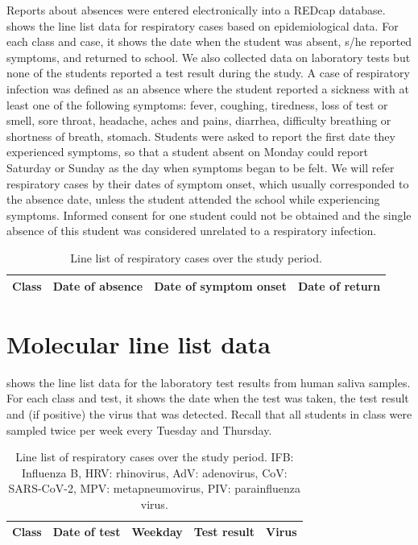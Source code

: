 \documentclass[fleqn,11pt]{wlscirep_supp}
\begin{document}
Reports about absences were entered electronically into a REDcap database\cite{Harris2009,Harris2019}.  shows the line list data for respiratory cases based on epidemiological data. For each class and case, it shows the date when the student was absent, s/he reported symptoms, and returned to school. We also collected data on laboratory tests but none of the students reported a test result during the study. A case of respiratory infection was defined as an absence where the student reported a sickness with at least one of the following symptoms: fever, coughing, tiredness, loss of test or smell, sore throat, headache, aches and pains, diarrhea, difficulty breathing or shortness of breath, stomach. Students were asked to report the first date they experienced symptoms, so that a student absent on Monday could report Saturday or Sunday as the day when symptoms began to be felt. We will refer respiratory cases by their dates of symptom onset, which usually corresponded to the absence date, unless the student attended the school while experiencing symptoms. Informed consent for one student could not be obtained and the single absence of this student was considered unrelated to a respiratory infection. 

{\footnotesize\begin{longtable}{l l l l}
    \caption[Line list of respiratory cases over the study period]{Line list of respiratory cases over the study period.}\label{tab:epi-data-line-list} \\
    \toprule
    Class & Date of absence & Date of symptom onset & Date of return \\
    \midrule
    
    \bottomrule
\end{longtable}}

\clearpage

\section{Molecular line list data}\label{sec:mol-data}

 shows the line list data for the laboratory test results from human saliva samples. For each class and test, it shows the date when the test was taken, the test result and (if positive) the virus that was detected. Recall that all students in class were sampled twice per week every Tuesday and Thursday. 

{\footnotesize\begin{longtable}{l l l l l}
    \caption[Line list of molecular test results over the study period]{Line list of respiratory cases over the study period. IFB: Influenza B, HRV: rhinovirus, AdV: adenovirus, CoV: SARS-CoV-2, MPV: metapneumovirus, PIV: parainfluenza virus.}\label{tab:mol-data-line-list} \\
    \toprule
    Class & Date of test & Weekday & Test result & Virus \\
    \midrule
    
    \bottomrule
\end{longtable}}
\end{document}
